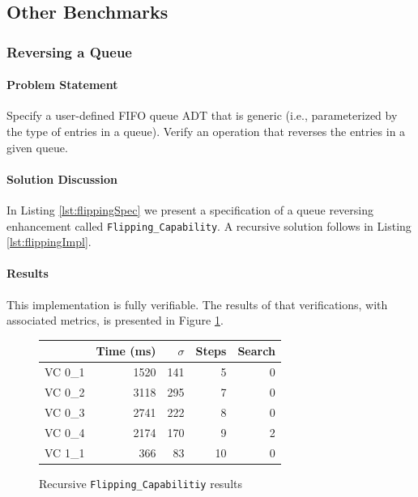 \FloatBarrier
	\subsection{Other Benchmarks}

		\subsubsection{Reversing a Queue\label{sec:reversingAQueue}}	

\paragraph{Problem Statement}Specify a user-defined FIFO queue ADT that is generic (i.e., parameterized by the type of entries in a queue). Verify an operation that reverses the entries in a given queue.

\paragraph{Solution Discussion}In Listing \ref{lst:flippingSpec} we present a specification of a queue reversing enhancement called \texttt{Flipping\_Capability}.  A recursive solution follows in Listing \ref{lst:flippingImpl}.






\paragraph{Results}This implementation is fully verifiable.  The results of that verifications, with associated metrics, is presented in Figure \ref{fig:flippingResults}.

\begin{figure}
	\centering
	\begin{tabular}{lrrrr}
		\toprule
			& Time (ms)	& $\sigma$& Steps & Search \\
		\midrule
		VC 0\_1	& 1520		& 141	& 5 	& 0     \\
		VC 0\_2	& 3118		& 295	& 7 	& 0     \\
		VC 0\_3	& 2741		& 222	& 8 	& 0     \\
		VC 0\_4	& 2174		& 170	& 9 	& 2     \\
		VC 1\_1	& 366		& 83	& 10	& 0     \\
		\bottomrule
	\end{tabular}
	\caption{Recursive \texttt{Flipping\_Capabilitiy} results\label{fig:flippingResults}}
\end{figure}

